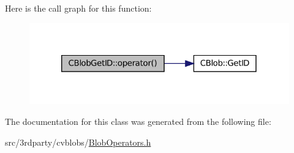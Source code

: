 Here is the call graph for this function:
\nopagebreak
\begin{figure}[H]
\begin{center}
\leavevmode
\includegraphics[width=320pt]{class_c_blob_get_i_d_a01557f50837f1e52f3b6c690c0af6592_cgraph}
\end{center}
\end{figure}




The documentation for this class was generated from the following file:\begin{DoxyCompactItemize}
\item 
src/3rdparty/cvblobs/\hyperlink{_blob_operators_8h}{BlobOperators.h}\end{DoxyCompactItemize}
